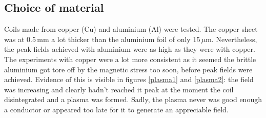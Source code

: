 


\subsection{Choice of material}

Coils made from copper (Cu) and aluminium (Al) were tested. The copper sheet 
was at 0.5\,mm a lot thicker than the aluminium foil of only 15\,$\mu$m.  
Nevertheless, the peak fields achieved with aluminium were as high as they were 
with copper. The experiments with copper were a lot more consistent as it 
seemed the brittle aluminium got tore off by the magnetic stress too soon, 
before peak fields were achieved. Evidence of this is visible in figures 
\ref{plasma1} and \ref{plasma2}: the field was increasing and clearly hadn't 
reached it peak at the moment the coil disintegrated and a plasma was formed.  
Sadly, the plasma never was good enough a conductor or appeared too late for it 
to generate an appreciable field.


